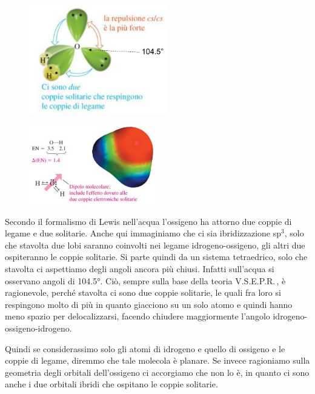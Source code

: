\hspace{2cm}\begin{minipage}{0.4\textwidth}
    \begin{figure}[H]
        \includegraphics[width=6cm]{immagini/acqua.png}
    \end{figure}
\end{minipage}
\begin{minipage}{0.3\textwidth}
    \begin{figure}[H]
        \includegraphics[width=5.5cm]{immagini/dipolo-acqua.png}
    \end{figure}
\end{minipage}

\vspace{0.2cm}Secondo il formalismo di Lewis nell'acqua l'ossigeno ha attorno due coppie di legame e due solitarie. Anche qui immaginiamo che ci sia ibridizzazione sp$^3$, solo che stavolta due lobi saranno coinvolti nei legame idrogeno-ossigeno, gli altri due ospiteranno le coppie solitarie. Si parte quindi da un sistema tetraedrico, solo che stavolta ci aspettiamo degli angoli ancora più chiusi. Infatti sull'acqua si osservano angoli di 104.5°. Ciò, sempre sulla base della teoria V.S.E.P.R.\,, è ragionevole, perché stavolta ci sono due coppie solitarie, le quali fra loro si respingono molto di più in quanto giacciono su un solo atomo e quindi hanno meno spazio per delocalizzarsi, facendo chiudere maggiormente l'angolo idrogeno-ossigeno-idrogeno.

Quindi se considerassimo solo gli atomi di idrogeno e quello di ossigeno e le coppie di legame, diremmo che tale molecola è planare. Se invece ragioniamo sulla geometria degli orbitali dell'ossigeno ci accorgiamo che non lo è, in quanto ci sono anche i due orbitali ibridi che ospitano le coppie solitarie.

